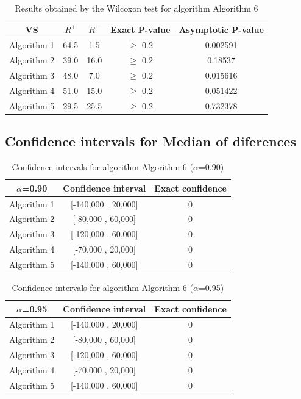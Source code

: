 \documentclass[a4paper,10pt]{article}
\begin{document}
\begin{table}[!htp]
\centering\small
\begin{tabular}{
|c|c|c|c|c|}
\hline
 VS & $R^{+}$ & $R^{-}$ & Exact P-value & Asymptotic P-value \\ \hline 
Algorithm 1 & 64.5 & 1.5 & $\geq$ 0.2 & 0.002591\\ \hline 
Algorithm 2 & 39.0 & 16.0 & $\geq$ 0.2 & 0.18537\\ \hline 
Algorithm 3 & 48.0 & 7.0 & $\geq$ 0.2 & 0.015616\\ \hline 
Algorithm 4 & 51.0 & 15.0 & $\geq$ 0.2 & 0.051422\\ \hline 
Algorithm 5 & 29.5 & 25.5 & $\geq$ 0.2 & 0.732378\\ \hline 

\end{tabular}
\caption{Results obtained by the Wilcoxon test for algorithm Algorithm 6}
\end{table}

\subsection{Confidence intervals for Median of diferences}

\begin{table}[!htp]
\centering\small
\begin{tabular}{
|c|c|c|}
\hline
 $\alpha$=0.90 & Confidence interval & Exact confidence \\ \hline 
Algorithm 1 & [-140,000 , 20,000] & 0\\ \hline 
Algorithm 2 & [-80,000 , 60,000] & 0\\ \hline 
Algorithm 3 & [-120,000 , 60,000] & 0\\ \hline 
Algorithm 4 & [-70,000 , 20,000] & 0\\ \hline 
Algorithm 5 & [-140,000 , 60,000] & 0\\ \hline 

\end{tabular}
\caption{Confidence intervals for algorithm Algorithm 6 ($\alpha$=0.90)}
\end{table}
\begin{table}[!htp]
\centering\small
\begin{tabular}{
|c|c|c|}
\hline
 $\alpha$=0.95 & Confidence interval & Exact confidence \\ \hline 
Algorithm 1 & [-140,000 , 20,000] & 0\\ \hline 
Algorithm 2 & [-80,000 , 60,000] & 0\\ \hline 
Algorithm 3 & [-120,000 , 60,000] & 0\\ \hline 
Algorithm 4 & [-70,000 , 20,000] & 0\\ \hline 
Algorithm 5 & [-140,000 , 60,000] & 0\\ \hline 

\end{tabular}
\caption{Confidence intervals for algorithm Algorithm 6 ($\alpha$=0.95)}
\end{table}

 \clearpage 
\end{document}
